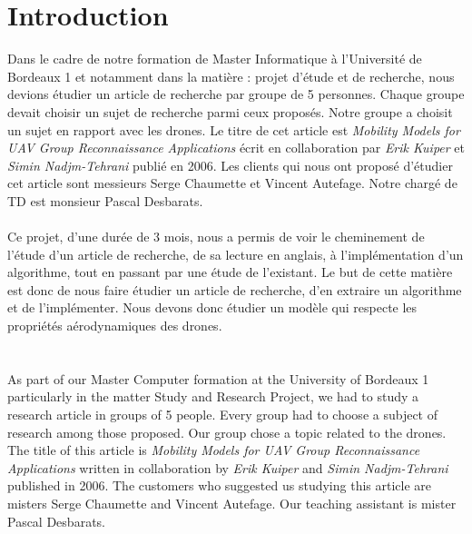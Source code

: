 \section*{Introduction}

Dans le cadre de notre formation de Master Informatique à l'Université de Bordeaux 1 et notamment dans la matière : projet d'étude et de recherche, nous devions étudier un article de recherche par groupe de 5 personnes. Chaque groupe devait choisir un sujet de recherche parmi ceux proposés. Notre groupe a choisit un sujet en rapport avec les drones. Le titre de cet article est \textit{Mobility Models for UAV Group Reconnaissance Applications} écrit en collaboration par \textit{Erik Kuiper} et \textit{Simin Nadjm-Tehrani} publié en 2006. Les clients qui nous ont proposé d'étudier cet article sont messieurs Serge Chaumette et Vincent Autefage. Notre chargé de TD est monsieur Pascal Desbarats.
\\\\
Ce projet, d'une durée de 3 mois, nous a permis de voir le cheminement de l'étude d'un article de recherche, de sa lecture en anglais, à l'implémentation d'un algorithme, tout en passant par une étude de l'existant.
Le but de cette matière est donc de nous faire étudier un article de recherche, d'en extraire un algorithme et de l'implémenter. Nous devons donc étudier un modèle qui respecte les propriétés aérodynamiques des drones.\\
\\\\
As part of our Master Computer formation at the University of Bordeaux 1 particularly in the matter Study and Research Project, we had to study a research article in groups of 5 people. Every group had to choose a subject of research among those proposed. Our group chose a topic related to the drones. The title of this article is \textit{Mobility Models for UAV Group Reconnaissance Applications} written in collaboration by \textit{Erik Kuiper} and \textit{Simin Nadjm-Tehrani} published in 2006. The customers who suggested us studying this article are misters Serge Chaumette and Vincent Autefage. Our teaching assistant is mister Pascal Desbarats.
\\\\

